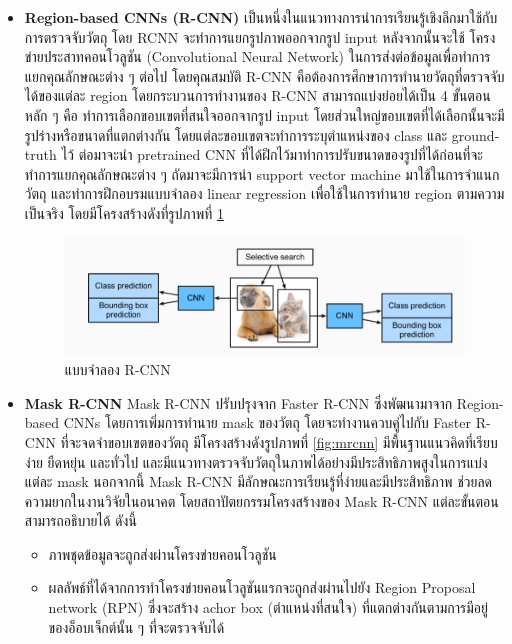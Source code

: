 \documentclass[12pt,oneside,openright,a4paper]{cpe-thai-project}
\begin{document}
\begin{itemize}

\item\textbf{Region-based CNNs (R-CNN)}
เป็นหนึ่งในแนวทางการนำการเรียนรู้เชิงลึกมาใช้กับการตรวจจับวัตถุ โดย RCNN จะทำการแยกรูปภาพออกจากรูป input หลังจากนั้นจะใช้ โครงข่ายประสาทคอนโวลูชัน (Convolutional Neural Network) ในการส่งต่อข้อมูลเพื่อทำการแยกคุณลักษณะต่าง ๆ ต่อไป โดยคุณสมบัติ R-CNN คือต้องการศึกษาการทำนายวัตถุที่ตรวจจับได้ของแต่ละ region โดยกระบวนการทำงานของ R-CNN สามารถแบ่งย่อยได้เป็น 4 ขั้นตอนหลัก ๆ คือ ทำการเลือกขอบเขตที่สนใจออกจากรูป input โดยส่วนใหญ่ขอบเขตที่ได้เลือกนั้นจะมีรูปร่างหรือขนาดที่แตกต่างกัน โดยแต่ละขอบเขตจะทำการระบุตำแหน่งของ class และ ground-truth ไว้ ต่อมาจะนำ pretrained CNN ที่ได้ฝึกไว้มาทำการปรับขนาดของรูปที่ได้ก่อนที่จะทำการแยกคุณลักษณะต่าง ๆ ถัดมาจะมีการนำ support vector machine มาใช้ในการจำแนกวัตถุ และทำการฝึกอบรมแบบจำลอง linear regression เพื่อใช้ในการทำนาย region ตามความเป็นจริง โดยมีโครงสร้างดังที่รูปภาพที่ \ref{fig:แบบจำลอง R-CNN} \cite{rCNN}
\begin{figure}[!h]\centering
\includegraphics[width=11cm]{images/RCNN model image.png}
\caption[แบบจำลอง R-CNN]{แบบจำลอง R-CNN \cite{img_rcnn}} \label{fig:แบบจำลอง R-CNN}
\end{figure}
\pagebreak
\item\textbf{Mask R-CNN}
Mask R-CNN ปรับปรุงจาก Faster R-CNN ซึ่งพัฒนามาจาก Region-based CNNs โดยการเพิ่มการทํานาย mask ของวัตถุ โดยจะทำงานควบคู่ไปกับ Faster R-CNN ที่จะจดจําขอบเขตของวัตถุ มีโครงสร้างดังรูปภาพที่ \ref{fig:mrcnn} มีพื้นฐานแนวคิดที่เรียบง่าย ยืดหยุ่น และทั่วไป และมีแนวทางตรวจจับวัตถุในภาพได้อย่างมีประสิทธิภาพสูงในการแบ่งแต่ละ mask นอกจากนี้ Mask R-CNN มีลักษณะการเรียนรู้ที่ง่ายและมีประสิทธิภาพ ช่วยลดความยากในงานวิจัยในอนาคต 
โดยสถาปัตยกรรมโครงสร้างของ Mask R-CNN แต่ละขั้นตอนสามารถอธิบายได้ ดังนี้
    \begin{itemize}
        \item ภาพชุดข้อมูลจะถูกส่งผ่านโครงข่ายคอนโวลูชัน
        \item ผลลัพธ์ที่ได้จากการทำโครงข่ายคอนโวลูชันแรกจะถูกส่งผ่านไปยัง Region Proposal network (RPN) ซึ่งจะสร้าง achor box (ตำแหน่งที่สนใจ) ที่แตกต่างกันตามการมีอยู่ของอ็อบเจ็กต์นั้น ๆ ที่จะตรวจจับได้

\end{itemize}
\end{itemize}
\end{document}
